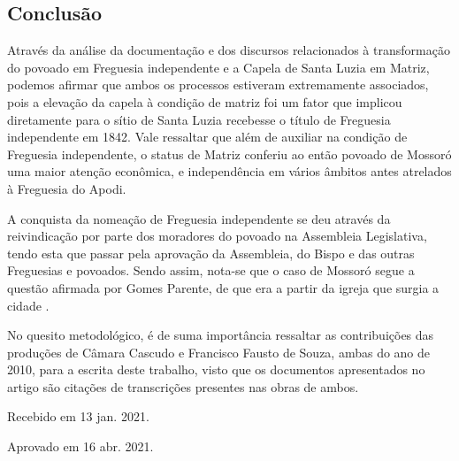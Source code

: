 \begin{refsection}
    \section{Conclusão}

    Através da análise da documentação e dos discursos relacionados à transformação do povoado em Freguesia independente e a Capela de Santa Luzia em Matriz, podemos afirmar que ambos os processos estiveram extremamente associados, pois a elevação da capela à condição de matriz foi um fator que implicou diretamente para o sítio de Santa Luzia recebesse o título de Freguesia independente em 1842. Vale ressaltar que além de auxiliar na condição de Freguesia independente, o status de Matriz conferiu ao então povoado de Mossoró uma maior atenção econômica, e independência em vários âmbitos antes atrelados à Freguesia do Apodi.

    A conquista da nomeação de Freguesia independente se deu através da reivindicação por parte dos moradores do povoado na Assembleia Legislativa, tendo esta que passar pela aprovação da Assembleia, do Bispo e das outras Freguesias e povoados.  Sendo assim, nota-se que o caso de Mossoró segue a questão afirmada por Gomes Parente, de que era a partir da igreja que surgia a cidade \cite[p.~195]{Parente1998Papel}.

    No quesito metodológico, é de suma importância ressaltar as contribuições das produções de Câmara Cascudo e Francisco Fausto de Souza, ambas do ano de 2010, para a escrita deste trabalho, visto que os documentos apresentados no artigo são citações de transcrições presentes nas obras de ambos.

    \printbibliography[heading=subbibliography,notcategory=fullcited]

    \hfill Recebido em 13 jan. 2021.

    \hfill Aprovado em 16 abr. 2021.

    \label{chap:institucionalizacaoend}

\end{refsection}
